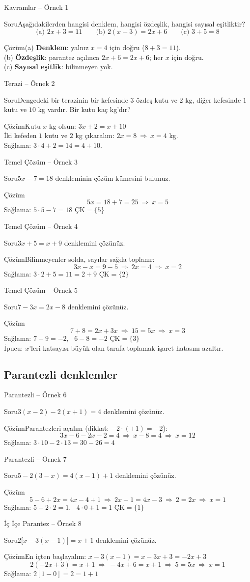\documentclass[aspectratio=169,11pt,handout]{beamer}
\newcommand{\soru}[3]{%
\begin{frame}{#1}
  \begin{block}{Soru}\large #2\end{block}
  \pause
  \begin{exampleblock}{Çözüm}\large #3\end{exampleblock}
\end{frame}}
\begin{document}
\soru{Kavramlar -- Örnek 1}
{Aşağıdakilerden hangisi denklem, hangisi özdeşlik, hangisi sayısal eşitliktir?
\[\text{(a) } 2x+3=11\qquad \text{(b) } 2(x+3)=2x+6\qquad \text{(c) } 3+5=8\]}
{(a) \textbf{Denklem}: yalnız \(x=4\) için doğru (\(8+3=11\)).\\[3pt]
(b) \textbf{Özdeşlik}: parantez açılınca \(2x+6=2x+6\); her \(x\) için doğru.\\[3pt]
(c) \textbf{Sayısal eşitlik}: bilinmeyen yok.}

\soru{Terazi -- Örnek 2}
{Dengedeki bir terazinin bir kefesinde \(3\) özdeş kutu ve \(2\) kg, diğer kefesinde \(1\) kutu ve \(10\) kg vardır. Bir kutu kaç kg'dır?}
{Kutu \(x\) kg olsun: \quad \(3x+2=x+10\)\\[3pt]
İki kefeden \(1\) kutu ve \(2\) kg çıkaralım: \quad \(2x=8\ \Rightarrow\ x=4\) kg.\\[3pt]
Sağlama: \(3\cdot 4+2=14=4+10\).}

\soru{Temel Çözüm -- Örnek 3}
{\(5x-7=18\) denkleminin çözüm kümesini bulunuz.}
{\[5x=18+7=25\ \Rightarrow\ x=5\]
Sağlama: \(5\cdot 5-7=18\) \checkmark \qquad \(\text{ÇK}=\{5\}\)}

\soru{Temel Çözüm -- Örnek 4}
{\(3x+5=x+9\) denklemini çözünüz.}
{Bilinmeyenler solda, sayılar sağda toplanır:
\[3x-x=9-5\ \Rightarrow\ 2x=4\ \Rightarrow\ x=2\]
Sağlama: \(3\cdot 2+5=11=2+9\) \checkmark \qquad \(\text{ÇK}=\{2\}\)}

\soru{Temel Çözüm -- Örnek 5}
{\(7-3x=2x-8\) denklemini çözünüz.}
{\[7+8=2x+3x\ \Rightarrow\ 15=5x\ \Rightarrow\ x=3\]
Sağlama: \(7-9=-2\), \ \(6-8=-2\) \checkmark \qquad \(\text{ÇK}=\{3\}\)\\[3pt]
İpucu: \(x\)'leri katsayısı büyük olan tarafa toplamak işaret hatasını azaltır.}

\subsection{Parantezli denklemler}
\soru{Parantezli -- Örnek 6}
{\(3(x-2)-2(x+1)=4\) denklemini çözünüz.}
{Parantezleri açalım (dikkat: \(-2\cdot(+1)=-2\)):
\[3x-6-2x-2=4\ \Rightarrow\ x-8=4\ \Rightarrow\ x=12\]
Sağlama: \(3\cdot 10-2\cdot 13=30-26=4\) \checkmark}

\soru{Parantezli -- Örnek 7}
{\(5-2(3-x)=4(x-1)+1\) denklemini çözünüz.}
{\[5-6+2x=4x-4+1\ \Rightarrow\ 2x-1=4x-3\ \Rightarrow\ 2=2x\ \Rightarrow\ x=1\]
Sağlama: \(5-2\cdot 2=1\), \ \(4\cdot 0+1=1\) \checkmark \qquad \(\text{ÇK}=\{1\}\)}

\soru{İç İçe Parantez -- Örnek 8}
{\(2\big[x-3(x-1)\big]=x+1\) denklemini çözünüz.}
{En içten başlayalım: \(x-3(x-1)=x-3x+3=-2x+3\)
\[2(-2x+3)=x+1\ \Rightarrow\ -4x+6=x+1\ \Rightarrow\ 5=5x\ \Rightarrow\ x=1\]
Sağlama: \(2[1-0]=2=1+1\) \checkmark}
\end{document}
